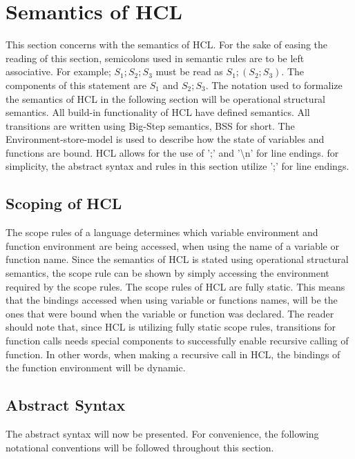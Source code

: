 \newpage
\section{Semantics of HCL}
\label{sec:semantics}
This section concerns with the semantics of HCL.
For the sake of easing the reading of this section, semicolons used in semantic rules are to be left associative.
For example; $S_1;S_2;S_3$ must be read as $S_1;(S_2;S_3)$.
The components of this statement are $S_1$ and $S_2;S_3$.
The notation used to formalize the semantics of HCL in the following section will be operational structural semantics.
All build-in functionality of HCL have defined semantics.
All transitions are written using Big-Step semantics, BSS for short.
The Environment-store-model is used to describe how the state of variables and functions are bound.
HCL allows for the use of ';' and '{\textbackslash}n' for line endings.
for simplicity, the abstract syntax and rules in this section utilize ';' for line endings. 

\subsection{Scoping of HCL}
The scope rules of a language determines which variable environment and function environment are being accessed, when using the name of a variable or function name.
Since the semantics of HCL is stated using operational structural semantics, the scope rule can be shown by simply accessing the environment required by the scope rules.
The scope rules of HCL are fully static.
This means that the bindings accessed when using variable or functions names, will be the ones that were bound when the variable or function was declared.
The reader should note that, since HCL is utilizing fully static scope rules, transitions for function calls needs special components to successfully enable recursive calling of function.
In other words, when making a recursive call in HCL, the bindings of the function environment will be dynamic.

\subsection{Abstract Syntax}
\label{abstract_syntax}
The abstract syntax will now be presented.
For convenience, the following notational conventions will be followed throughout this section.

